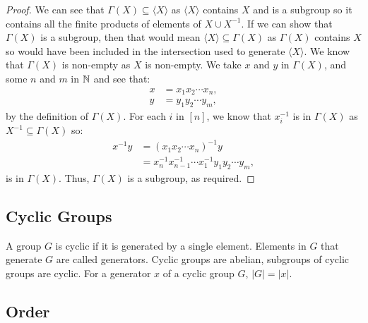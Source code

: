 \begin{proof}
    We can see that $\Gamma(X) \subseteq \langle X \rangle$ as $\langle X \rangle$
    contains $X$ and is a subgroup so it contains all the finite products
    of elements of $X \cup X^{-1}$.
    If we can show that $\Gamma(X)$ is a subgroup, then that would mean
    $\langle X \rangle \subseteq \Gamma(X)$ as $\Gamma(X)$ contains $X$
    so would have been included in the intersection used to generate 
    $\langle X \rangle$. We know that $\Gamma(X)$ is non-empty as $X$ is
    non-empty. We take $x$ and $y$ in $\Gamma(X)$, and some $n$ and $m$ in $\mathbb{N}$
    and see that: \begin{align*}
        x &= x_1 x_2 \cdots x_n, \\
        y &= y_1 y_2 \cdots y_m, 
    \end{align*} by the definition of $\Gamma(X)$. For each $i$ in $[n]$, 
    we know that $x_i^{-1}$ is in $\Gamma(X)$ as 
    $X^{-1} \subseteq \Gamma(X)$ so: \begin{align*}
        x^{-1}y &= (x_1 x_2 \cdots x_n)^{-1}y \\
        &= x_n^{-1}x_{n - 1}^{-1} \cdots x_1^{-1} y_1 y_2 \cdots y_m,
    \end{align*} is in $\Gamma(X)$. Thus, $\Gamma(X)$
    is a subgroup, as required.
\end{proof}

\subsection{Cyclic Groups} \label{1.13} \label{1.14} \label{1.16}

A group $G$ is cyclic if it is generated by a single element. Elements in
$G$ that generate $G$ are called generators. Cyclic groups are
abelian, subgroups of cyclic groups are cyclic. For a generator $x$
of a cyclic group $G$, $|G| = |x|$. 

\subsection{Order} \label{1.3}

